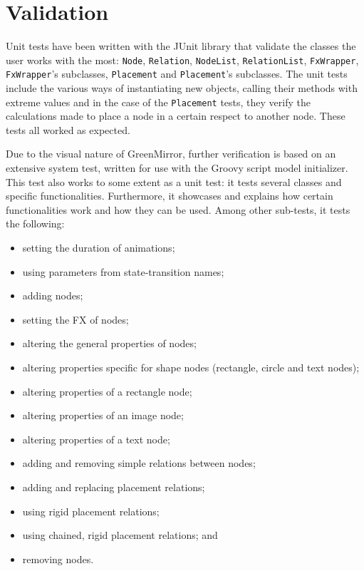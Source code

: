 \section{Validation}\label{sec:validation}
Unit tests have been written with the JUnit library that validate the classes the user works with the most: \lstinline{Node}, \lstinline{Relation}, \lstinline{NodeList}, \lstinline{RelationList}, \lstinline{FxWrapper}, \lstinline{FxWrapper}'s subclasses, \lstinline{Placement} and \lstinline{Placement}'s subclasses. The unit tests include the various ways of instantiating new objects, calling their methods with extreme values and in the case of the \lstinline{Placement} tests, they verify the calculations made to place a node in a certain respect to another node. These tests all worked as expected.
\par Due to the visual nature of GreenMirror, further verification is based on an extensive system test, written for use with the Groovy script model initializer. This test also works to some extent as a unit test: it tests several classes and specific functionalities. Furthermore, it showcases and explains how certain functionalities work and how they can be used. Among other sub-tests, it tests the following:
\begin{itemize}
\item setting the duration of animations;
\item using parameters from state-transition names;
\item adding nodes;
\item setting the FX of nodes;
\item altering the general properties of nodes;
\item altering properties specific for shape nodes (rectangle, circle and text nodes);
\item altering properties of a rectangle node;
\item altering properties of an image node;
\item altering properties of a text node;
\item adding and removing simple relations between nodes;
\item adding and replacing placement relations;
\item using rigid placement relations;
\item using chained, rigid placement relations; and
\item removing nodes.
\end{itemize}
